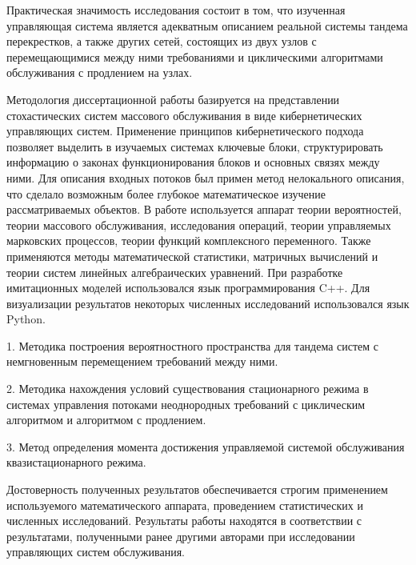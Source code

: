 Практическая значимость исследования состоит в том, что изученная управляющая система является адекватным описанием реальной системы тандема перекрестков, а также других сетей, состоящих из двух узлов с перемещающимися между ними требованиями и циклическими алгоритмами обслуживания с продлением на узлах.




{\methods} Методология диссертационной работы базируется на представлении стохастических систем массового обслуживания в виде кибернетических управляющих систем. Применение принципов кибернетического подхода позволяет выделить в изучаемых системах ключевые блоки, структурировать информацию о законах функционирования блоков и основных связях между ними. Для описания входных потоков был примен метод нелокального описания, что сделало возможным более глубокое математическое изучение рассматриваемых объектов. В работе используется аппарат теории вероятностей, теории массового обслуживания, исследования операций, теории управляемых марковских процессов, теории функций комплексного переменного. Также применяются методы математической статистики, матричных вычислений и теории систем линейных алгебраических уравнений. При разработке имитационных моделей использовался язык программирования C++. Для визуализации результатов некоторых численных исследований использовался язык Python.


{}

1. Методика построения вероятностного пространства для тандема систем с немгновенным перемещением требований между ними.

2. Методика нахождения условий существования стационарного режима в системах управления потоками неоднородных требований с циклическим алгоритмом и алгоритмом с продлением.

3. Метод определения момента достижения управляемой системой обслуживания квазистационарного режима.





{\probation} Достоверность полученных результатов обеспечивается строгим применением используемого математического аппарата, проведением статистических и численных исследований. Результаты работы находятся в соответствии с результатами, полученными ранее другими авторами при исследовании управляющих систем обслуживания.

